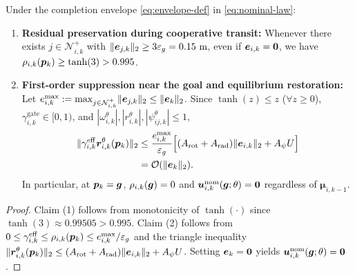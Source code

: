 \begin{proposition}\label{prop:envelope}
Under the completion envelope \eqref{eq:envelope-def} in \eqref{eq:nominal-law}:
\begin{enumerate}
 \item \textbf{Residual preservation during cooperative transit:} Whenever there exists $j\in\mathcal N_{i,k}^+$ with $\lVert\boldsymbol{e}_{j,k}\rVert_2\ge 3\varepsilon_g=0.15\ \mathrm m$, even if $\boldsymbol{e}_{i,k}=\boldsymbol 0$, we have $\rho_{i,k}(\boldsymbol{p}_k)\ge\tanh(3)>0.995$.
 \item \textbf{First-order suppression near the goal and equilibrium restoration:} Let $e_{i,k}^{\max}:=\max_{j\in\mathcal N_{i,k}^+}\lVert\boldsymbol{e}_{j,k}\rVert_2\le\lVert\boldsymbol{e}_k\rVert_2$. Since $\tanh(z)\le z$ ($\forall z\ge 0$), $\gamma_{i,k}^{\mathrm{gate}}\in[0,1)$, and $|\omega_{i,k}^\theta|,|r_{i,k}^\theta|,|\psi_{ij,k}^\theta|\le 1$,
 \begin{equation}
 \begin{split}
  \lVert\gamma_{i,k}^{\mathrm{eff}}\boldsymbol{r}_{i,k}^\theta(\boldsymbol{p}_k)\rVert_2
  &\le \frac{e_{i,k}^{\max}}{\varepsilon_g}\Big[(A_{\mathrm{rot}}+A_{\mathrm{rad}})\lVert\boldsymbol{e}_{i,k}\rVert_2+A_\psi U\Big]\\
  &=\mathcal O(\lVert\boldsymbol{e}_k\rVert_2).
 \end{split}\label{eq:residual-bound}
 \end{equation}
 In particular, at $\boldsymbol{p}_k=\boldsymbol{g}$, $\rho_{i,k}(\boldsymbol{g})=0$ and $\boldsymbol{u}_{i,k}^{\mathrm{nom}}(\boldsymbol{g};\theta)=\boldsymbol 0$ regardless of $\boldsymbol\mu_{i,k-1}$.
\end{enumerate}
\end{proposition}
\begin{proof}
Claim (1) follows from monotonicity of $\tanh(\cdot)$ since $\tanh(3)\approx 0.99505>0.995$. Claim (2) follows from $0\le\gamma_{i,k}^{\mathrm{eff}}\le\rho_{i,k}(\boldsymbol{p}_k)\le e_{i,k}^{\max}/\varepsilon_g$ and the triangle inequality $\lVert\boldsymbol{r}_{i,k}^\theta(\boldsymbol{p}_k)\rVert_2\le(A_{\mathrm{rot}}+A_{\mathrm{rad}})\lVert\boldsymbol{e}_{i,k}\rVert_2+A_\psi U$. Setting $\boldsymbol{e}_k=\boldsymbol 0$ yields $\boldsymbol{u}_{i,k}^{\mathrm{nom}}(\boldsymbol{g};\theta)=\boldsymbol 0$.
\end{proof}

